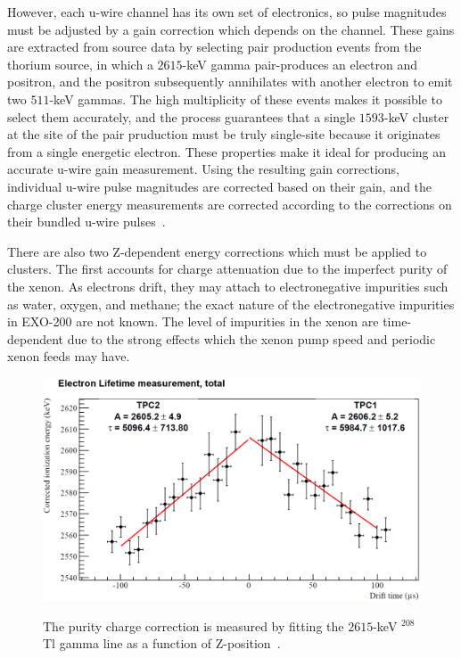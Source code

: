 However, each u-wire channel has its own set of electronics, so pulse magnitudes must be adjusted by a gain correction which depends on the channel.  These gains are extracted from source data by selecting pair production events from the thorium source, in which a $2615$-keV gamma pair-produces an electron and positron, and the positron subsequently annihilates with another electron to emit two $511$-keV gammas.  The high multiplicity of these events makes it possible to select them accurately, and the process guarantees that a single $1593$-keV cluster at the site of the pair pruduction must be truly single-site because it originates from a single energetic electron.  These properties make it ideal for producing an accurate u-wire gain measurement.  Using the resulting gain corrections, individual u-wire pulse magnitudes are corrected based on their gain, and the charge cluster energy measurements are corrected according to the corrections on their bundled u-wire pulses~\cite{EnergyDocumentRun2a}.

There are also two Z-dependent energy corrections which must be applied to clusters.  The first accounts for charge attenuation due to the imperfect purity of the xenon.  As electrons drift, they may attach to electronegative impurities such as water, oxygen, and methane; the exact nature of the electronegative impurities in EXO-200 are not known.  The level of impurities in the xenon are time-dependent due to the strong effects which the xenon pump speed and periodic xenon feeds may have.

\begin{figure}
\begin{center}
\includegraphics[keepaspectratio=true,width=\textwidth]{LongThPurityMeasurement.png}
\end{center}
\renewcommand{\baselinestretch}{1}
\small\normalsize
\begin{quote}
\caption{The purity charge correction is measured by fitting the $2615$-keV $^{208}$Tl gamma line as a function of Z-position~\cite{EnergyDocumentRun2ab}.}
\label{fig:ThPurityMeasurement}
\end{quote}
\end{figure}
\renewcommand{\baselinestretch}{2}
\small\normalsize

